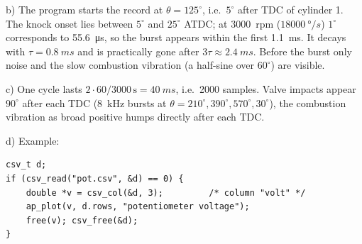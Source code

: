 \begin{solution}
b) The program starts the record at $\theta=125^\circ$, i.e.\ $5^\circ$ after
TDC of cylinder 1. The knock onset lies between $5^\circ$ and $25^\circ$ ATDC;
at \SI{3000}{rpm} ($\SI{18000}{\degree/s}$) $1^\circ$ corresponds to
\SI{55.6}{\micro s}, so the burst appears within the first \SI{1.1}{ms}.
It decays with $\tau=\SI{0.8}{ms}$ and is practically gone after
$3\tau\approx\SI{2.4}{ms}$. Before the burst only noise and the slow
combustion vibration (a half-sine over $60^\circ$) are visible.

c) One cycle lasts $2\cdot 60/3000\,\text{s} = \SI{40}{ms}$, i.e.\ 2000 samples.
Valve impacts appear $90^\circ$ after each TDC (\SI{8}{kHz} bursts at
$\theta = 210^\circ, 390^\circ, 570^\circ, 30^\circ$), the combustion vibration as
broad positive humps directly after each TDC.

d) Example:
\begin{lstlisting}
csv_t d;
if (csv_read("pot.csv", &d) == 0) {
    double *v = csv_col(&d, 3);         /* column "volt" */
    ap_plot(v, d.rows, "potentiometer voltage");
    free(v); csv_free(&d);
}
\end{lstlisting}
\end{solution}
\endgroup
